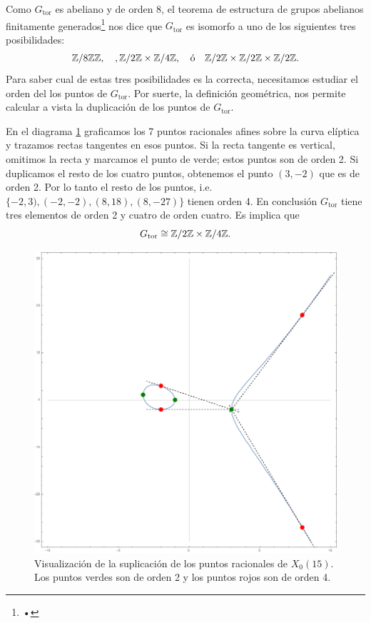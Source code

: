 \documentclass[../../tesis_maestria]{subfiles}
\begin{document}
Como $G_\mathrm{tor}$ es abeliano y de orden 8, el teorema de estructura de grupos abelianos finitamente generados\footnote{•} nos dice que $G_\mathrm{tor}$ es isomorfo a  uno de los siguientes tres posibilidades:
\[
	\mathbb{Z}/8\mathbb{Z}\mathbb{Z},\quad,\mathbb{Z}/2\mathbb{Z}\times\mathbb{Z}/4\mathbb{Z},\quad\text{ó}\quad \mathbb{Z}/2\mathbb{Z}\times\mathbb{Z}/2\mathbb{Z}\times\mathbb{Z}/2\mathbb{Z}.
\]
Para saber cual de estas tres posibilidades es la correcta, necesitamos estudiar el orden del los puntos de $G_\mathrm{tor}$. Por suerte, la definición geométrica, nos permite calcular a vista la duplicación de los puntos de $G_\mathrm{tor}$.

En el diagrama \ref{fig:orden-puntos-racionales} graficamos los 7 puntos racionales afines sobre la curva elíptica y trazamos rectas tangentes en esos puntos. Si la recta tangente es vertical, omitimos la recta y marcamos el punto de verde; estos puntos son de orden 2. Si duplicamos el resto de los cuatro puntos, obtenemos el punto $(3,-2)$ que es de orden 2. Por lo tanto el resto de los puntos, i.e. $\{-2,3),(-2,-2),(8,18),(8,-27)\}$ tienen orden 4. En conclusión $G_\mathrm{tor}$ tiene tres elementos de orden 2 y cuatro de orden cuatro. Es implica que
\[
	G_\mathrm{tor}\cong\mathbb{Z}/2\mathbb{Z}\times\mathbb{Z}/4\mathbb{Z}.
\]

\begin{figure}[!h]%
  \centering
  \includegraphics[scale=0.3]{figuras/orden-puntos-racionales}
  \caption{Visualización de la suplicación de los puntos racionales de $X_0(15)$. Los puntos verdes son de orden 2 y los puntos rojos son de orden 4.}
  \label{fig:orden-puntos-racionales}
\end{figure}%
\end{document}
